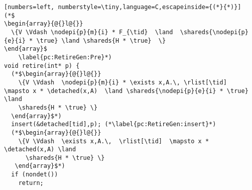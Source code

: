 \begin{figure*}
{\small
\begin{lstlisting}[numbers=left, numberstyle=\tiny,language=C,escapeinside={(*}{*)}]
(*$
\begin{array}{@{}l@{}}  
  \{V \Vdash \nodepi{p}{m}{i} * F_{\tid}  \land  \shareds{\nodepi{p}{e}{i} * \true} \land \shareds{H * \true}  \}
\end{array}$
    \label{pc:RetireGen:Pre}*) 
void retire(int* p) {  
  (*$\begin{array}{@{}l@{}}  
    \{V \Vdash  \nodepi{p}{m}{i} * \exists x,A.\, \rlist[\tid]  \mapsto x * \detached(x,A)  \land \shareds{\nodepi{p}{e}{i} * \true} \land 
    \shareds{H * \true} \}
  \end{array}$*) 
  insert(&detached[tid],p); (*\label{pc:RetireGen:insert}*)
  (*$\begin{array}{@{}l@{}}
    \{V \Vdash  \exists x,A.\,  \rlist[\tid]  \mapsto x * \detached(x,A) \land  
      \shareds{H * \true} \}
   \end{array}$*) 
  if (nondet())
    return;


\end{lstlisting}}
\end{figure*}
